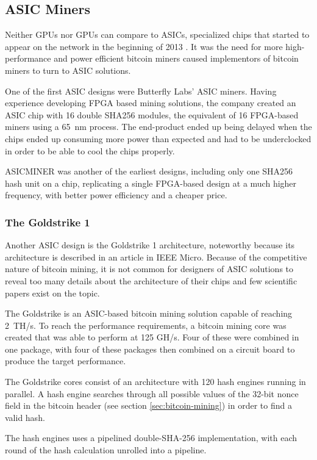 \subsection{ASIC Miners}

Neither GPUs nor GPUs can compare to ASICs, specialized chips that started to appear on the network
in the beginning of 2013 \cite{first-asic-miner}. It was the need for more high-performance and power
efficient bitcoin miners caused implementors of bitcoin miners to turn to ASIC solutions.

One of the first ASIC designs were Butterfly Labs' ASIC miners. Having experience developing
FPGA based mining solutions, the company created an ASIC chip with 16 double SHA256 modules,
the equivalent of 16 FPGA-based miners using a 65~nm process. The end-product ended up being
delayed when the chips ended up consuming more power than expected and had to be underclocked
in order to be able to cool the chips properly.

ASICMINER was another of the earliest designs, including only one SHA256 hash unit on a chip,
replicating a single FPGA-based design at a much higher frequency, with better power efficiency
and a cheaper price. \cite{bespoke-silicon}

\subsubsection{The Goldstrike 1}
Another ASIC design is the Goldstrike 1 architecture, noteworthy because its architecture is
described in an article in IEEE Micro. Because of the competitive nature of bitcoin mining,
it is not common for designers of ASIC solutions to reveal too many details about the architecture
of their chips and few scientific papers exist on the topic.

The Goldstrike is an ASIC-based bitcoin mining solution capable of reaching 2~TH/s. To reach the performance
requirements, a bitcoin mining core was created that was able to perform at 125 GH/s. Four of
these were combined in one package, with four of these packages then combined on a circuit board
to produce the target performance.

The Goldstrike cores consist of an architecture with 120 hash engines running in parallel.
A hash engine searches through all possible values of the 32-bit nonce field in the bitcoin header
(see section \ref{sec:bitcoin-mining}) in order to find a valid hash.

The hash engines uses a pipelined double-SHA-256 implementation, with each round of the hash calculation
unrolled into a pipeline.

